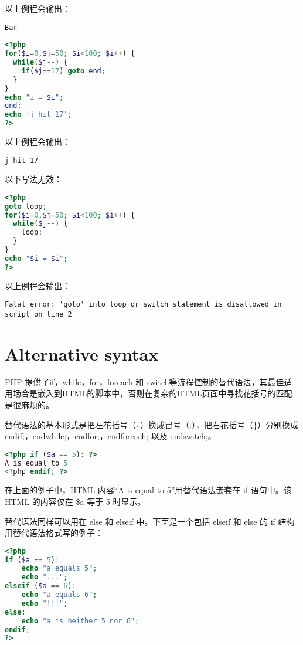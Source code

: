 以上例程会输出：

\begin{verbatim}
Bar
\end{verbatim}

\begin{lstlisting}[language=PHP]
<?php
for($i=0,$j=50; $i<100; $i++) {
  while($j--) {
    if($j==17) goto end; 
  }  
}
echo "i = $i";
end:
echo 'j hit 17';
?>
\end{lstlisting}

以上例程会输出：

\begin{verbatim}
j hit 17
\end{verbatim}

以下写法无效：

\begin{lstlisting}[language=PHP]
<?php
goto loop;
for($i=0,$j=50; $i<100; $i++) {
  while($j--) {
    loop:
  }
}
echo "$i = $i";
?>
\end{lstlisting}

以上例程会输出：

\begin{verbatim}
Fatal error: 'goto' into loop or switch statement is disallowed in
script on line 2
\end{verbatim}


\section{Alternative syntax}


PHP 提供了if，while，for，foreach 和 switch等流程控制的替代语法，其最佳适用场合是嵌入到HTML的脚本中，否则在复杂的HTML页面中寻找花括号的匹配是很麻烦的。

替代语法的基本形式是把左花括号（\{）换成冒号（:），把右花括号（\}）分别换成 endif;，endwhile;，endfor;，endforeach; 以及 endswitch;。

\begin{lstlisting}[language=PHP]
<?php if ($a == 5): ?>
A is equal to 5
<?php endif; ?>
\end{lstlisting}


在上面的例子中，HTML 内容“A is equal to 5”用替代语法嵌套在 if 语句中。该 HTML 的内容仅在 \$a 等于 5 时显示。

替代语法同样可以用在 else 和 elseif 中。下面是一个包括 elseif 和 else 的 if 结构用替代语法格式写的例子：


\begin{lstlisting}[language=PHP]
<?php
if ($a == 5):
    echo "a equals 5";
    echo "...";
elseif ($a == 6):
    echo "a equals 6";
    echo "!!!";
else:
    echo "a is neither 5 nor 6";
endif;
?>
\end{lstlisting}

